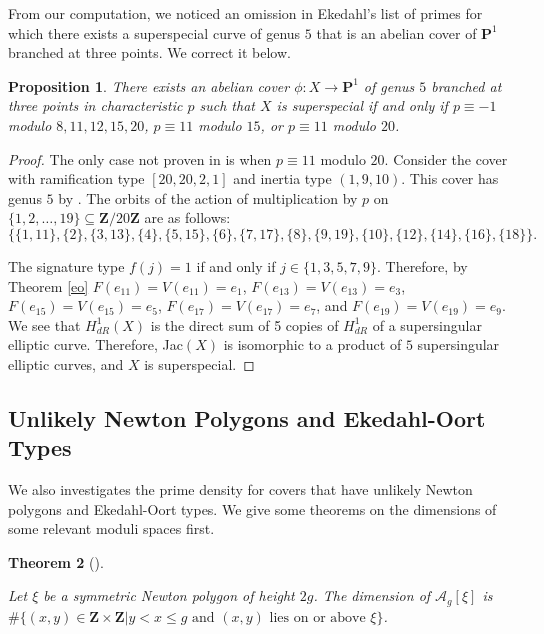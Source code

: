 \documentclass{article}
\newtheorem{theorem}{Theorem}[section]
\newtheorem{proposition}[theorem]{Proposition}
\theoremstyle{remark}
\theoremstyle{definition}
\begin{document}
\par From our computation, we noticed an omission in Ekedahl's list of primes for which there exists a superspecial curve of genus $5$ that is an abelian cover of $\mathbf{P}^1$ branched at three points. We correct it below.

\begin{proposition}\label{eke}
    There exists an abelian cover $\phi: X \to \mathbf{P}^1$ of genus $5$ branched at three points in characteristic $p$ such that $X$ is superspecial if and only if $p \equiv -1$ modulo $8,11,12,15,20$, $p \equiv 11$ modulo $15$, or $p \equiv 11$ modulo $20$.
\end{proposition}

\begin{proof}
    \par The only case not proven in \cite[Page 173]{ekedahl_supersingular_1987} is when $p \equiv 11$ modulo $20$. Consider the cover with ramification type $[20,20,2,1]$ and inertia type $(1,9,10)$. This cover has genus $5$ by \cite[Lemma 2.3]{booher_supersingular_2025}. The orbits of the action of multiplication by $p$ on $\{1,2, \ldots, 19\} \subseteq \mathbf{Z}/20\mathbf{Z}$ are as follows:
    \[\{\{1,11\}, \{2\}, \{3,13\}, \{4\}, \{5,15\}, \{6\}, \{7,17\}, \{8\}, \{9,19\}, \{10\}, \{12\}, \{14\}, \{16\}, \{18\} \}.\]
    \par The signature type $f(j) =1$ if and only if $j \in \{1,3,5,7,9\}$. Therefore, by Theorem \ref{eo} $F(e_{11}) = V(e_{11}) = e_1$, $F(e_{13}) = V(e_{13}) = e_3$, $F(e_{15}) =V(e_{15}) = e_5$, $F(e_{17}) = V(e_{17}) = e_7$, and $F(e_{19}) = V(e_{19}) = e_9$. We see that $H^1_{dR}(X)$ is the direct sum of 5 copies of $H^1_{dR}$ of a supersingular elliptic curve. Therefore, Jac$(X)$ is isomorphic to a product of $5$ supersingular elliptic curves, and $X$ is superspecial.
\end{proof}

\subsection{Unlikely Newton Polygons and Ekedahl-Oort Types}

\par \hspace{\parindent} We also investigates the prime density for covers that have unlikely Newton polygons and Ekedahl-Oort types. We give some theorems on the dimensions of some relevant moduli spaces first.
\begin{theorem}[]
    \label{npdim}

    Let $\xi$ be a symmetric Newton polygon of height $2g$. The dimension of $\mathcal{A}_g[\xi]$
is $\#\{(x, y) \in \mathbf{Z} \times \mathbf{Z} | y < x \leq g \textrm{ and } (x, y) \textrm{ lies on or above } \xi \}$.
\end{theorem}
\end{document}
